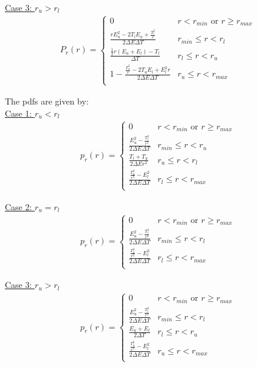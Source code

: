 \documentclass[review]{elsarticle}
\begin{document}
\underline{Case 3: $r_u > r_l$}
\begin{align*}
 P_r(r) =  \left\{ \begin{array}{ll}
         0 & r < r_{min} \text{ or }r \ge r_{max} \\
         \frac{r E_u^2 - 2 T_l E_u + \frac{T_l^2}{r}}{2 \Delta E \Delta T} &  r_{min} \le r < r_l \\
         \frac{\frac{1}{2}r (E_u + E_l) - T_l}{\Delta T} & r_l \le r < r_u \\
         1 - \frac{\frac{T_u^2}{r} - 2 T_u E_l + E_l^2 r}{2 \Delta E \Delta T} & r_u \le r < r_{max} \\
        \end{array} \right.
\end{align*}

The pdfs are given by:\\

\underline{Case 1: $r_u < r_l$}
\begin{align*}
 p_r(r) =  \left\{ \begin{array}{ll}
         0 & r < r_{min} \text{ or }r \ge r_{max} \\
         \frac{E_u^2  - \frac{T_l^2}{r^2}}{2 \Delta E \Delta T} &  r_{min} \le r < r_u \\
         \frac{ T_l + T_u}{2\Delta E r^2} & r_u \le r < r_l \\
         \frac{\frac{T_u^2}{r^2} - E_l^2}{2 \Delta E \Delta T} & r_l \le r < r_{max} \\
        \end{array} \right.
\end{align*}

\underline{Case 2: $r_u = r_l$}
\begin{align*}
 p_r(r) =  \left\{ \begin{array}{ll}
         0 & r < r_{min} \text{ or }r \ge r_{max} \\
         \frac{E_u^2  - \frac{T_l^2}{r^2}}{2 \Delta E \Delta T} &  r_{min} \le r < r_l \\
         \frac{\frac{T_u^2}{r^2} - E_l^2}{2 \Delta E \Delta T} & r_l \le r < r_{max} \\
        \end{array} \right.
\end{align*}

\underline{Case 3: $r_u > r_l$}
\begin{align*}
 p_r(r) =  \left\{ \begin{array}{ll}
         0 & r < r_{min} \text{ or }r \ge r_{max} \\
         \frac{E_u^2  - \frac{T_l^2}{r^2}}{2 \Delta E \Delta T} &  r_{min} \le r < r_l \\
         \frac{E_u + E_l}{2\Delta T} & r_l \le r < r_u \\
          \frac{\frac{T_u^2}{r^2} - E_l^2}{2 \Delta E \Delta T}  & r_u \le r < r_{max} \\
        \end{array} \right.
\end{align*}
\end{document}
